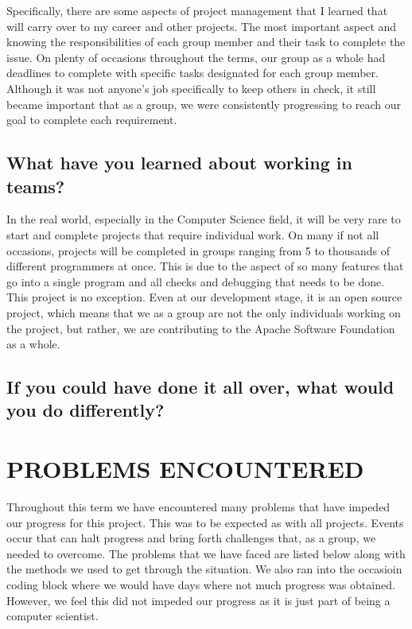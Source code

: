 \documentclass[draftclsnofoot,10pt,onecolumn]{IEEEtran} %
\begin{document}
Specifically, there are some aspects of project management that I learned that will carry over to my career and other projects. The most important aspect and knowing the responsibilities of each group member and their task to complete the issue. On plenty of occasions throughout the terms, our group as a whole had deadlines to complete with specific tasks designated for each group member. Although it was not anyone's job specifically to keep others in check, it still became important that as a group, we were consistently progressing to reach our goal to complete each requirement.

\subsection{What have you learned about working in teams?}
In the real world, especially in the Computer Science field, it will be very rare to start and complete projects that require individual work. On many if not all occasions, projects will be completed in groups ranging from 5 to thousands of different programmers at once. This is due to the aspect of so many features that go into a single program and all checks and debugging that needs to be done. This project is no exception. Even at our development stage, it is an open source project, which means that we as a group are not the only individuals working on the project, but rather, we are contributing to the Apache Software Foundation as a whole.

\subsection{If you could have done it all over, what would you do differently?}


\section{PROBLEMS ENCOUNTERED}

Throughout this term we have encountered many problems that have impeded our
progress for this project. This was to be expected as with all projects.  Events
occur that can halt progress and bring forth challenges that, as a group, we
needed to overcome. The problems that we have faced are listed below along with
the methods we used to get through the situation. We also ran into the occasioin
coding block where we would have days where not much progress was obtained.
However, we feel this did not impeded our progress as it is just part of being a
computer scientist.
\end{document}
